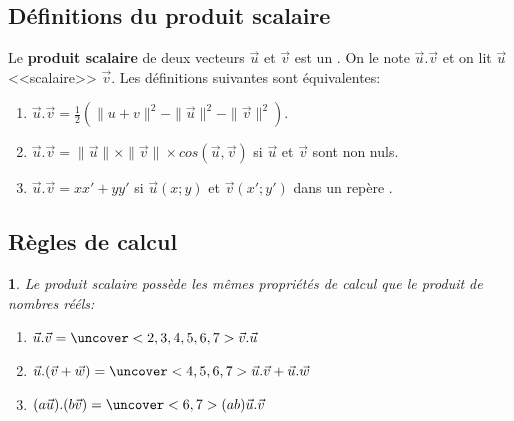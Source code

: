 \documentclass{beamer}
\newtheorem{proposition}[theorem]{\translate{Proposition}}
\theoremstyle{plain}
\begin{document}
 \subsection{Définitions du produit scalaire}
 
 \begin{frame}
 \begin{definition}
  Le \textbf{produit scalaire} de deux vecteurs $\vec{u}$ et $\vec{v}$ est un 
  . On le note
  $\vec{u}.\vec{v}$ et on lit $\vec{u}$ <<scalaire>> $\vec{v}$. Les définitions suivantes sont équivalentes:
  
  \begin{enumerate}
   \item $\vec{u}.\vec{v}=\frac{1}{2}(\|u+v\|^2-\|\vec{u}\|^2-\|\vec{v}\|^2)$.
   \item $\vec{u}.\vec{v}=\|\vec{u}\|\times\|\vec{v}\|\times cos(\vec{u},\vec{v})$ si $\vec{u}$ et $\vec{v}$ sont non nuls.
   \item $\vec{u}.\vec{v}=xx'+yy'$ si $\vec{u}(x;y)$ et $\vec{v}(x';y')$ dans un repère 
   .
  \end{enumerate}
  
 \end{definition}
 \end{frame}

 \subsection{Règles de calcul}
   
 \begin{frame}
 
 
 \begin{proposition}
  Le produit scalaire possède les mêmes propriétés de calcul que le produit de nombres rééls:
  \begin{enumerate}
   \item 
   $\vec{u}.\vec{v}=\uncover<2,3,4,5,6,7>{\vec{v}.\vec{u}}$
   \item $\vec{u}.(\vec{v}+\vec{w})=
   \uncover<4,5,6,7>{\vec{u}.\vec{v}+\vec{u}.\vec{w}}$
   \item $(a\vec{u}).(b\vec{v})=\uncover<6,7>{(ab)\vec{u}.\vec{v}}$
  \end{enumerate}

 \end{proposition}
 
 \end{frame}
 
\end{document}
